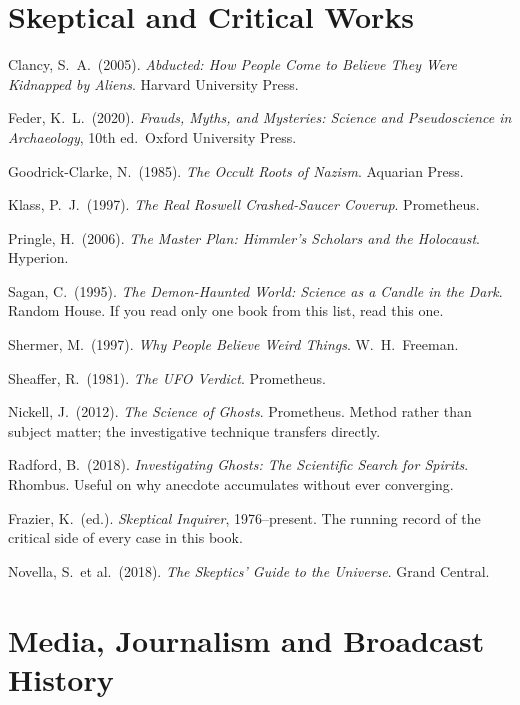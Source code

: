 \section*{Skeptical and Critical Works}

\begin{list}{}{\setlength{\leftmargin}{1.2em}\setlength{\itemindent}{-1.2em}
\setlength{\itemsep}{3pt}}
\item Clancy, S.\ A.\ (2005). \emph{Abducted: How People Come to Believe They Were Kidnapped by
Aliens}. Harvard University Press.
\item Feder, K.\ L.\ (2020). \emph{Frauds, Myths, and Mysteries: Science and Pseudoscience in
Archaeology}, 10th ed.\ Oxford University Press.
\item Goodrick-Clarke, N.\ (1985). \emph{The Occult Roots of Nazism}. Aquarian Press.
\item Klass, P.\ J.\ (1997). \emph{The Real Roswell Crashed-Saucer Coverup}. Prometheus.
\item Pringle, H.\ (2006). \emph{The Master Plan: Himmler's Scholars and the Holocaust}. Hyperion.
\item Sagan, C.\ (1995). \emph{The Demon-Haunted World: Science as a Candle in the Dark}. Random House.
If you read only one book from this list, read this one.
\item Shermer, M.\ (1997). \emph{Why People Believe Weird Things}. W.\ H.\ Freeman.
\item Sheaffer, R.\ (1981). \emph{The UFO Verdict}. Prometheus.
\item Nickell, J.\ (2012). \emph{The Science of Ghosts}. Prometheus. Method rather than subject
matter; the investigative technique transfers directly.
\item Radford, B.\ (2018). \emph{Investigating Ghosts: The Scientific Search for Spirits}.
Rhombus. Useful on why anecdote accumulates without ever converging.
\item Frazier, K.\ (ed.). \emph{Skeptical Inquirer}, 1976--present. The running record of the
critical side of every case in this book.
\item Novella, S.\ et al.\ (2018). \emph{The Skeptics' Guide to the Universe}. Grand Central.
\end{list}

\section*{Media, Journalism and Broadcast History}


